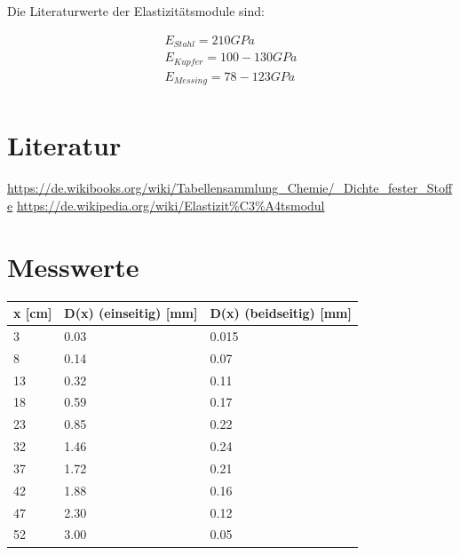Die Literaturwerte der Elastizitätsmodule sind: 

\begin{align*}
    E_{Stahl} = 210GPa\\
    E_{Kupfer} = 100-130GPa\\
    E_{Messing} = 78-123GPa\\
\end{align*}



\section{Literatur}

\hyperlink{Dichte}{https://de.wikibooks.org/wiki/Tabellensammlung_Chemie/_Dichte_fester_Stoffe}
\hyperlink{E-modul}{https://de.wikipedia.org/wiki/Elastizit\%C3\%A4tsmodul}

\section{Messwerte}

\begin{minipage}{\linewidth}
    \begin{table}[H]
        \centering
    \begin{tabular}{lll}
        \toprule
        x [cm] & D(x) (einseitig) [mm] & D(x) (beidseitig) [mm] \\
        \midrule
        3  & 0.03 & 0.015 \\
        8  & 0.14 & 0.07  \\
        13 & 0.32 & 0.11  \\
        18 & 0.59 & 0.17  \\
        23 & 0.85 & 0.22  \\
        32 & 1.46 & 0.24  \\
        37 & 1.72 & 0.21  \\
        42 & 1.88 & 0.16  \\
        47 & 2.30 & 0.12  \\
        52 & 3.00 & 0.05  \\
        \bottomrule   
    \end{tabular}
    
    \label{tab:1}
\end{table}
\end{minipage}


